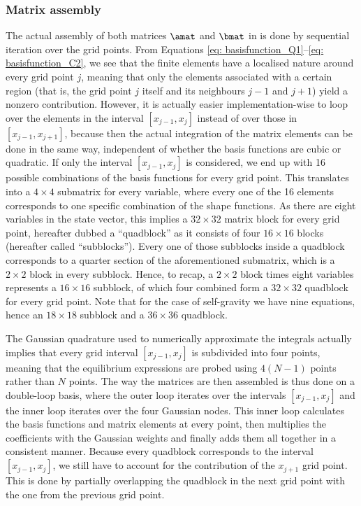 \subsubsection{Matrix assembly}
The actual assembly of both matrices $\amat$ and $\bmat$ in {\legolas} is done by sequential iteration over the grid points. From Equations \eqref{eq: basisfunction_Q1}--\eqref{eq: basisfunction_C2}, we see that the finite elements have a localised nature around every grid point $j$, meaning that only the elements associated with a certain region (that is, the grid point $j$ itself and its neighbours $j - 1$ and $j + 1$) yield a nonzero contribution. However, it is actually easier implementation-wise to loop over the elements in the interval $[x_{j-1}, x_j]$ instead of over those in $[x_{j-1}, x_{j+1}]$, because then the actual integration of the matrix elements can be done in the same way, independent of whether the basis functions are cubic or quadratic. If only the interval $[x_{j-1}, x_j]$ is considered, we end up with 16 possible combinations of the basis functions for every grid point. This translates into a $4 \times 4$ submatrix for every variable, where every one of the 16 elements corresponds to one specific combination of the shape functions. As there are eight variables in the state vector, this implies a $32 \times 32$ matrix block for every grid point, hereafter dubbed a ``quadblock'' as it consists of four $16 \times 16$ blocks (hereafter called ``subblocks''). Every one of those subblocks inside a quadblock corresponds to a quarter section of the aforementioned submatrix, which is a $2 \times 2$ block in every subblock. Hence, to recap, a $2 \times 2$ block times eight variables represents a $16 \times 16$ subblock, of which four combined form a $32 \times 32$ quadblock for every grid point. Note that for the case of self-gravity we have nine equations, hence an $18 \times 18$ subblock and a $36 \times 36$ quadblock.

The Gaussian quadrature used to numerically approximate the integrals actually implies that every grid interval
$[x_{j-1}, x_j]$ is subdivided into four points, meaning that the equilibrium expressions are probed using $4(N - 1)$ points rather than $N$ points. The way the matrices are then assembled is thus done on a double-loop basis, where the outer loop iterates over the intervals $[x_{j-1}, x_j]$ and the inner loop iterates over the four Gaussian nodes. This inner loop calculates the basis functions and matrix elements at every point, then multiplies the coefficients with the Gaussian weights and finally adds them all together in a consistent manner. Because every quadblock corresponds to the interval $[x_{j-1}, x_j]$, we still have to account for the contribution of the $x_{j+1}$ grid point. This is done by partially overlapping the quadblock in the next grid point with the one from the previous grid point.

